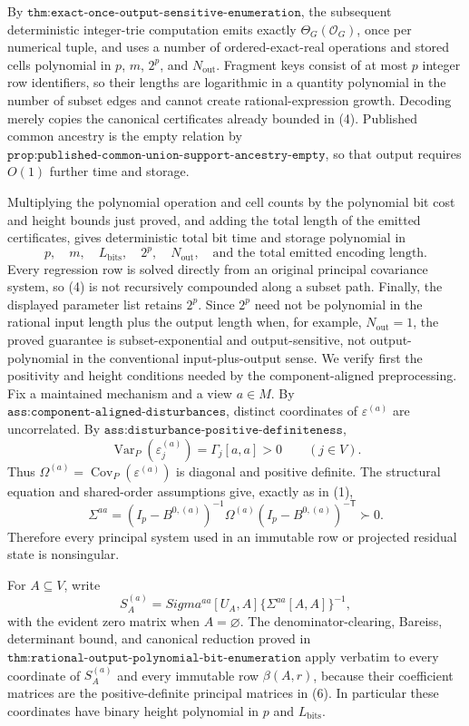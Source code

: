 By \(\texttt{thm:exact-once-output-sensitive-enumeration}\), the subsequent deterministic integer-trie computation emits exactly \(\Theta_G(\mathcal O_G)\), once per numerical tuple, and uses a number of ordered-exact-real operations and stored cells polynomial in \(p\), \(m\), \(2^p\), and \(N_{\mathrm{out}}\).  Fragment keys consist of at most \(p\) integer row identifiers, so their lengths are logarithmic in a quantity polynomial in the number of subset edges and cannot create rational-expression growth.  Decoding merely copies the canonical certificates already bounded in (4).  Published common ancestry is the empty relation by \(\texttt{prop:published-common-union-support-ancestry-empty}\), so that output requires \(O(1)\) further time and storage.

Multiplying the polynomial operation and cell counts by the polynomial bit cost and height bounds just proved, and adding the total length of the emitted certificates, gives deterministic total bit time and storage polynomial in
\[
 p,\quad m,\quad L_{\mathrm{bits}},\quad 2^p,
 \quad N_{\mathrm{out}},\quad
 \text{and the total emitted encoding length}.
\]
Every regression row is solved directly from an original principal covariance system, so (4) is not recursively compounded along a subset path.  Finally, the displayed parameter list retains \(2^p\).  Since \(2^p\) need not be polynomial in the rational input length plus the output length when, for example, \(N_{\mathrm{out}}=1\), the proved guarantee is subset-exponential and output-sensitive, not output-polynomial in the conventional input-plus-output sense.
We verify first the positivity and height conditions needed by the component-aligned preprocessing.  Fix a maintained mechanism and a view \(a\in M\).  By \(\texttt{ass:component-aligned-disturbances}\), distinct coordinates of \(\varepsilon^{(a)}\) are uncorrelated.  By \(\texttt{ass:disturbance-positive-definiteness}\),
\[
 \operatorname{Var}_P(\varepsilon_j^{(a)})
 =\Gamma_j[a,a]>0
 \qquad (j\in V).
\tag{5}
\]
Thus \(\Omega^{(a)}=\operatorname{Cov}_P(\varepsilon^{(a)})\) is diagonal and positive definite.  The structural equation and shared-order assumptions give, exactly as in (1),
\[
 \Sigma^{aa}=(I_p-B^{0,(a)})^{-1}
 \Omega^{(a)}(I_p-B^{0,(a)})^{-\mathsf T}\succ0.
\tag{6}
\]
Therefore every principal system used in an immutable row or projected residual state is nonsingular.

For \(A\subseteq V\), write
\[
 S_A^{(a)}=Sigma^{aa}[U_A,A]
 \{\Sigma^{aa}[A,A]\}^{-1},
\]
with the evident zero matrix when \(A=\varnothing\).  The denominator-clearing, Bareiss, determinant bound, and canonical reduction proved in \(\texttt{thm:rational-output-polynomial-bit-enumeration}\) apply verbatim to every coordinate of \(S_A^{(a)}\) and every immutable row \(\beta(A,r)\), because their coefficient matrices are the positive-definite principal matrices in (6).  In particular these coordinates have binary height polynomial in \(p\) and \(L_{\mathrm{bits}}\).

